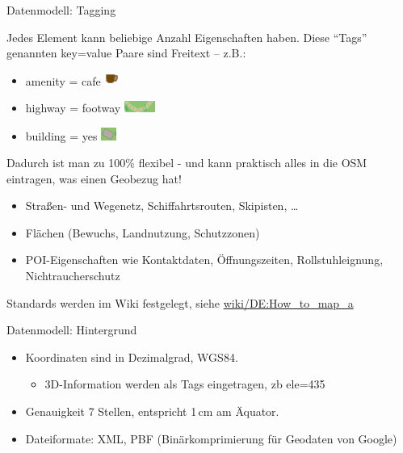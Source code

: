 \documentclass{beamer}
\begin{document}
\begin{frame}{Datenmodell: Tagging}

Jedes Element kann beliebige Anzahl Eigenschaften haben. 
Diese "`Tags"' genannten key=value Paare sind Freitext -- z.B.:
\begin{itemize}
  \item amenity = cafe \includegraphics[width=0.5cm]{cafe.png}
  \item highway = footway \includegraphics[width=1cm]{footway.png}
  \item building = yes  \includegraphics[width=0.5cm]{building.png}
\end{itemize}

\pause
Dadurch ist man zu 100\% flexibel - und kann praktisch alles in die OSM eintragen, was einen Geobezug hat!

\begin{itemize}
  \item Straßen- und Wegenetz, Schiffahrtsrouten, Skipisten, \dots
  \item Flächen (Bewuchs, Landnutzung, Schutzzonen)
  \item POI-Eigenschaften wie Kontaktdaten, Öffnungszeiten, Rollstuhleignung, Nichtraucherschutz
\end{itemize}

Standards werden im Wiki festgelegt, siehe \href{http://wiki.openstreetmap.org/wiki/DE:How\_to\_map\_a}{wiki/DE:How\_to\_map\_a}

\end{frame}

\begin{frame}{Datenmodell: Hintergrund}

\begin{itemize}
  \item Koordinaten sind in Dezimalgrad, WGS84.
  \begin{itemize}
  \item 3D-Information werden als Tags eingetragen, zb ele=435
\end{itemize}
  \item Genauigkeit 7 Stellen, entspricht 1\,cm am Äquator.
  \item Dateiformate: XML, PBF (Binärkomprimierung für Geodaten von Google)
\end{itemize}

\end{frame}
\end{document}
